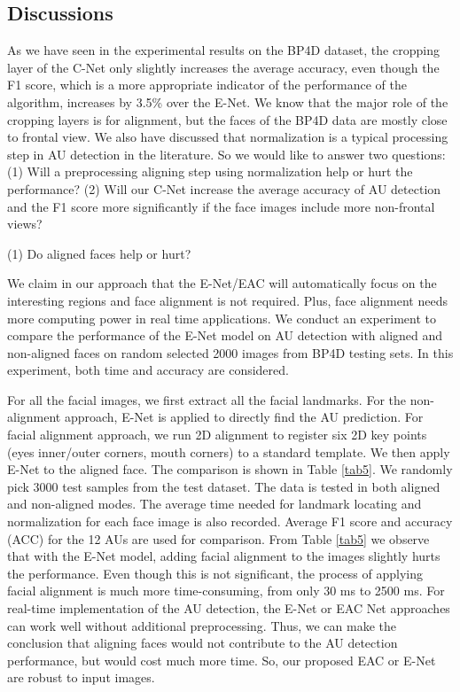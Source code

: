 \documentclass[a4paper, 10pt, conference]{ieeeconf}      %
\begin{document}
\subsection{Discussions}

As we have seen in the experimental results on the BP4D dataset, the cropping layer of the C-Net only slightly increases the average accuracy, even though the F1 score, which is a more appropriate indicator of the performance of the algorithm, increases by 3.5\% over the E-Net. We know that the major role of the cropping layers is for alignment, but the faces of the BP4D data are mostly close to frontal view. We also have discussed that normalization is a typical processing step in AU detection in the literature. So we would like to answer two questions: (1) Will a preprocessing aligning step using normalization help or hurt the performance? (2) Will our C-Net increase the average accuracy of AU detection and the F1 score more significantly if the face images include more non-frontal views?

(1) Do aligned faces help or hurt?

We claim in our approach that the E-Net/EAC will automatically focus on the interesting regions and face alignment is not required. Plus, face alignment needs more computing power in real time applications. We conduct an experiment to compare the performance of the E-Net model on AU detection with aligned and non-aligned faces on random selected 2000 images from BP4D testing sets. In this experiment, both time and accuracy are considered.

For all the facial images, we first extract all the facial landmarks. For the non-alignment approach, E-Net is applied to directly find the AU prediction. For facial alignment approach, we run 2D alignment to register six 2D key points (eyes inner/outer corners, mouth corners) to a standard template. We then apply E-Net to the aligned face. The comparison is shown in Table \ref{tab5}. We randomly pick 3000 test samples from the test dataset. The data is tested in both aligned and non-aligned modes. The average time needed for landmark locating and normalization for each face image is also recorded. Average F1 score and accuracy (ACC) for the 12 AUs are used for comparison. From Table \ref{tab5} we observe that with the E-Net model, adding facial alignment to the images slightly hurts the performance. Even though this is not significant, the process of applying facial alignment is much more time-consuming, from only 30 ms to 2500 ms. For real-time implementation of the AU detection, the E-Net or EAC Net approaches can work well without additional preprocessing. Thus, we can make the conclusion that aligning faces would not contribute to the AU detection performance, but would cost much more time. So, our proposed EAC or E-Net are robust to input images.
\end{document}
